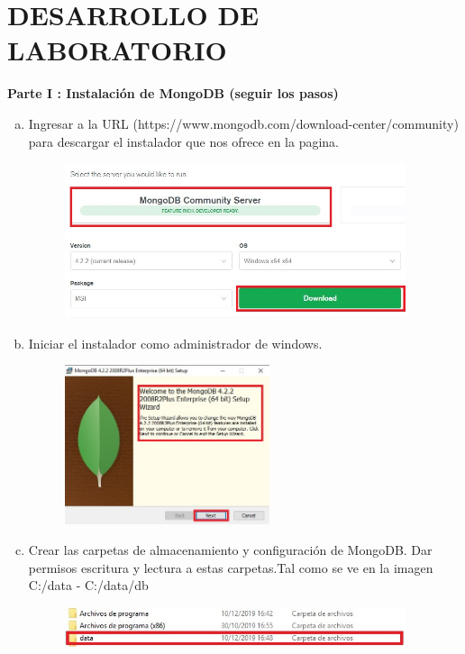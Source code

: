 \documentclass[preprint,12pt]{elsarticle}
\begin{document}
\section{DESARROLLO DE LABORATORIO}
\textbf{Parte I : Instalación de MongoDB (seguir los pasos)}
\begin{enumerate}[a)]
\item Ingresar a la URL (https://www.mongodb.com/download-center/community) para descargar el instalador que nos ofrece en la pagina.
\begin{figure}[htb]
	\begin{center}
		\includegraphics[width=10cm]{./IMAGENES/Mongo01}
	\end{center}
\end{figure}
\item Iniciar el instalador como administrador de windows.
\begin{figure}[htb]
	\begin{center}
		\includegraphics[width=6cm]{./IMAGENES/Mongo02}
	\end{center}
\end{figure}

\item Crear las carpetas de almacenamiento y configuración de MongoDB.
Dar permisos escritura y lectura a estas carpetas.Tal como se ve en la imagen
C:/data - C:/data/db
\begin{figure}[htb]
	\begin{center}
		\includegraphics[width=10cm]{./IMAGENES/Mongo03}
	\end{center}
\end{figure}


\end{enumerate}
\end{document}
